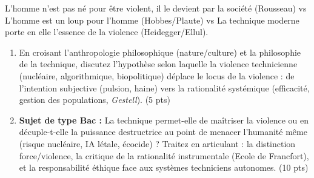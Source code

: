 \documentclass[11pt]{article}
\begin{document}
\begin{exercice}
\og L'homme n'est pas né pour être violent, il le devient par la société \fg{} (Rousseau) vs \og L'homme est un loup pour l'homme \fg{} (Hobbes/Plaute) vs \og La technique moderne porte en elle l'essence de la violence \fg{} (Heidegger/Ellul).

\begin{enumerate}
    \item En croisant l'anthropologie philosophique (nature/culture) et la philosophie de la technique, discutez l'hypothèse selon laquelle la \og violence technicienne \fg{} (nucléaire, algorithmique, biopolitique) déplace le locus de la violence : de l'intention subjective (pulsion, haine) vers la rationalité systémique (efficacité, gestion des populations, \textit{Gestell}). (5 pts)
    \item \textbf{Sujet de type Bac :} \og La technique permet-elle de maîtriser la violence ou en décuple-t-elle la puissance destructrice au point de menacer l'humanité même (risque nucléaire, IA létale, écocide) ? \fg{} Traitez en articulant : la distinction force/violence, la critique de la rationalité instrumentale (Ecole de Francfort), et la responsabilité éthique face aux \og systèmes techniciens \fg{} autonomes. (10 pts)
\end{enumerate}
\end{exercice}
\end{document}
